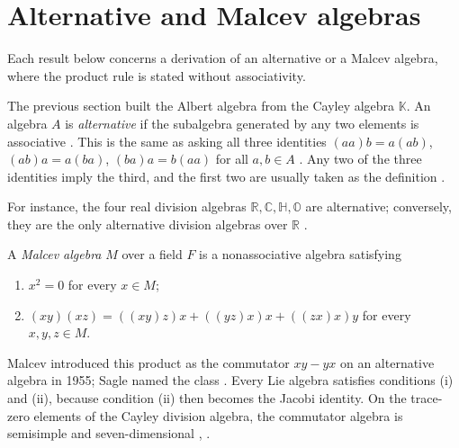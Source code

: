 \section{Alternative and Malcev algebras}\label{sec:nonassociative:alternative}

Each result below concerns a derivation of an alternative or a Malcev algebra,
where the product rule is stated without associativity. %

The previous section built the Albert algebra from the Cayley algebra
$\mathbb{K}$. An algebra $A$ is \emph{alternative} if the subalgebra generated
by any two elements is associative \cite[p.~148]{Baez2002Octonions}. This is
the same as asking all three identities $(aa)b=a(ab)$, $(ab)a=a(ba)$,
$(ba)a=b(aa)$ for all $a,b\in A$ \cite[p.~148]{Baez2002Octonions}. Any two of
the three identities imply the third, and the first two are usually taken as
the definition \cite[p.~148]{Baez2002Octonions}.

For instance, the four real division algebras $\mathbb{R},\mathbb{C},
\mathbb{H},\mathbb{O}$ are alternative; conversely, they are the only
alternative division algebras over $\mathbb{R}$ \cite[Theorem,
p.~148]{Baez2002Octonions}.

\begin{definition}
\label{def:nonassociative:malcev}
A \emph{Malcev algebra} $M$ over a field $F$ is a nonassociative algebra
satisfying
\begin{enumerate}
\item [(i)] $x^{2}=0$ for every $x\in M$;
\item [(ii)] $(xy)(xz) = ((xy)z)x+((yz)x)x+((zx)x)y$ for every $x,y,z\in
M$.
\end{enumerate}
\end{definition}

Malcev introduced this product as the commutator $xy-yx$ on an alternative
algebra in 1955; Sagle named the class \cite[p.~565]{Davenport1972Malcev}.
Every Lie algebra satisfies conditions (i) and (ii), because condition (ii)
then becomes the Jacobi identity. On the trace-zero elements of the Cayley
division algebra, the commutator algebra is semisimple and seven-dimensional
\cite[p.~148]{Baez2002Octonions}, \cite[p.~52]{McCrimmon2004Taste}.

